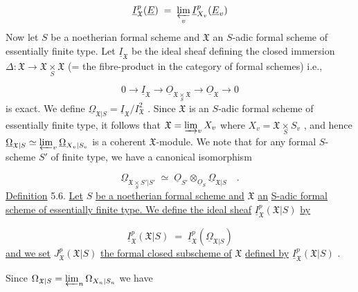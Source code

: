 \begin{equation*}
\underline{I}^p_{\mathfrak{X}}(\underline{E}) \;=\; \varprojlim_{v} \underline{I}^p_{X_v}(\underline{E}_v)
\end{equation*}
Now let $S$ be a noetherian formal scheme and $\mathfrak{X}$ an $S$-adic formal scheme of essentially finite type. Let $\underline{I}_{\mathfrak{X}}$ be the ideal sheaf defining the closed immersion $\Delta : \mathfrak{X} \to \mathfrak{X} \underset{S}{\times} \mathfrak{X}$ (= the fibre-product in the category of formal schemes) i.e.,

\begin{equation*}
0 \to \underline{I}_{\mathfrak{X}} \to \underline{O}_{\mathfrak{X} \underset{S}{\times} \mathfrak{X}} \to \underline{O}_{\mathfrak{X}} \to 0
\end{equation*}
is exact. We define $\underline{\Omega}_{\mathfrak{X}|S} = \underline{I}_{\mathfrak{X}}/I^2_{\mathfrak{X}}$ . Since $\mathfrak{X}$ is an $S$-adic formal scheme of essentially finite type, it follows that $\mathfrak{X} = \varinjlim_{v} X_v$ where $X_v = \mathfrak{X} \underset{S}{\times} S_v$ , and hence $\underline{\Omega}_{\mathfrak{X}|S} \simeq \varprojlim_{v} \underline{\Omega}_{X_v|S_v}$ is a coherent $\mathfrak{X}$-module. We note that for any formal $S$-scheme $S'$ of finite type, we have a canonical isomorphism

\begin{equation*}
\underline{\Omega}_{\mathfrak{X} \underset{S}{\times} S'|S'} \;\simeq\; \underline{O}_{S'} \otimes_{\underline{O}_S} \underline{\Omega}_{\mathfrak{X}|S} \quad .
\end{equation*}
\underline{Definition} 5.6. \underline{Let} $S$ \underline{be a noetherian formal scheme and} $\mathfrak{X}$ \underline{an} \underline{S-adic formal scheme of essentially finite type. We define the ideal sheaf} $\underline{I}^p_{\mathfrak{X}}(\mathfrak{X}|S)$ \underline{by}

\begin{equation*}
\underline{I}^p_{\mathfrak{X}}(\mathfrak{X}|S) \;=\; \underline{I}^p_{\mathfrak{X}}(\underline{\Omega}_{\mathfrak{X}|S})
\end{equation*}
\underline{and we set} $J^p_{\mathfrak{X}}(\mathfrak{X}|S)$ \underline{the formal closed subscheme of} $\mathfrak{X}$ \underline{defined by} $\underline{I}^p_{\mathfrak{X}}(\mathfrak{X}|S)$ .

Since $\Omega_{\mathfrak{X}|S} = \varprojlim_{n} \Omega_{X_n|S_n}$ we have 



